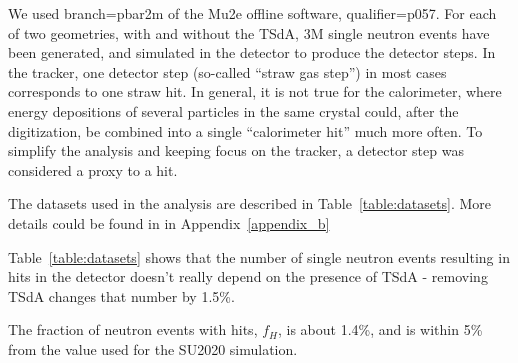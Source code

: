 \documentclass[12pt]{article}
\begin{document}
We used branch=pbar2m of the Mu2e offline software, qualifier=p057.
For each of two geometries, with and without the TSdA, 3M single neutron events
have been generated, and simulated in the detector to produce the detector steps.
In the tracker, one detector step (so-called ``straw gas step'') in most cases
corresponds to one straw hit. In general, it is not true for the calorimeter, where
energy depositions of several particles in the same crystal could,
after the digitization, be combined into a single ``calorimeter hit'' much more often.
To simplify the analysis and keeping focus on the tracker, a detector step was considered
a proxy to a hit.

The datasets used in the analysis are described in Table~\ref{table:datasets}.
More details could be found in in Appendix~\ref{appendix_b}

\begin{table}[H]
  \caption{
    \label{table:datasets}
    $N_0$ : the total number of generated events; 
    $N_1$: number of simulated events with at least one detector step 
  }
\end{table}

Table~\ref{table:datasets} shows that the number of single neutron events resulting
in hits in the detector doesn't really depend on the presence of TSdA - removing TSdA 
changes that number by 1.5\%.

The fraction of neutron events with hits, $f_H$, is about 1.4\%, and 
is within 5\% from the value used for the SU2020 simulation\cite{SU2020_DOC_MIXING}.
\end{document}
